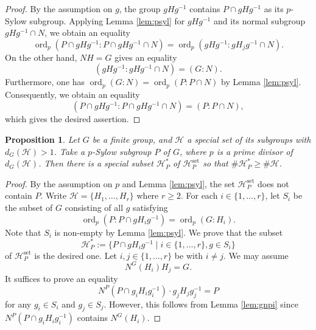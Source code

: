 \documentclass[12pt]{amsart}
\theoremstyle{plain}
\newtheorem{prop}[thm]{Proposition}
\theoremstyle{definition}
\numberwithin{thm}{section}
\numberwithin{equation}{section}
\newcommand{\cH}{\mathcal{H}}
\DeclareMathOperator{\ord}{ord}
\DeclareMathOperator{\set}{set}
\begin{document}
\begin{proof}
By the assumption on $g$, the group $gHg^{-1}$ contains $P\cap gHg^{-1}$ as its $p$-Sylow subgroup. Applying Lemma \ref{lem:psyl} for $gHg^{-1}$ and its normal subgroup $gHg^{-1}\cap N$, we obtain an equality
\begin{equation*}
    \ord_{p}(P\cap gHg^{-1}:P\cap gHg^{-1}\cap N)=\ord_{p}(gHg^{-1}:gH_{j}g^{-1}\cap N). 
\end{equation*}
On the other hand, $NH=G$ gives an equality
\begin{equation*}
    (gHg^{-1}:gHg^{-1}\cap N)=(G:N). 
\end{equation*}
Furthermore, one has $\ord_{p}(G:N)=\ord_{p}(P:P\cap N)$ by Lemma \ref{lem:psyl}. Consequently, we obtain an equality
\begin{equation*}
    (P\cap gHg^{-1}:P\cap gHg^{-1}\cap N)=(P:P\cap N), 
\end{equation*}
which gives the desired assertion. 
\end{proof}

\begin{prop}\label{prop:syad}
Let $G$ be a finite group, and $\cH$ a special set of its subgroups with $d_G(\cH)>1$. Take a $p$-Sylow subgroup $P$ of $G$, where $p$ is a prime divisor of $d_{G}(\cH)$. Then there is a special subset $\cH_{P}^{\ast}$ of $\cH_{P}^{\set}$ so that $\#\cH_{P}^{\ast}\geq \#\cH$. 
\end{prop}

\begin{proof}
By the assumption on $p$ and Lemma \ref{lem:psyl}, the set $\cH_{P}^{\set}$ does not contain $P$. Write $\cH=\{H_{1},\ldots,H_{r}\}$ where $r\geq 2$. For each $i\in \{1,\ldots,r\}$, let $S_{i}$ be the subset of $G$ consisting of all $g$ satisfying
\begin{equation*}
    \ord_{p}(P:P\cap gH_{i}g^{-1})=\ord_{p}(G:H_{i}). 
\end{equation*}
Note that $S_{i}$ is non-empty by Lemma \ref{lem:psyl}. We prove that the subset
\begin{equation*}
    \cH_{P}^{\ast}:=\{P\cap gH_{i}g^{-1}\mid i\in \{1,\ldots,r\},g\in S_{i}\}
\end{equation*}
of $\cH_{P}^{\set}$ is the desired one. Let $i,j\in \{1,\ldots,r\}$ be with $i\neq j$. We may assume 
\begin{equation}\label{eq:ijgn}
    N^{G}(H_{i})H_{j}=G. 
\end{equation}
It suffices to prove an equality
\begin{equation}\label{eq:ijpg}
    N^{P}(P\cap g_{i}H_{i}g_{i}^{-1})\cdot g_{j}H_{j}g_{j}^{-1}=P
\end{equation}
for any $g_{i}\in S_{i}$ and $g_{j}\in S_{j}$. However, this follows from Lemma \ref{lem:gnpi} since $N^{P}(P\cap g_{i}H_{i}g_{i}^{-1})$ contains $N^{G}(H_{i})$. 
\end{proof}
\end{document}
